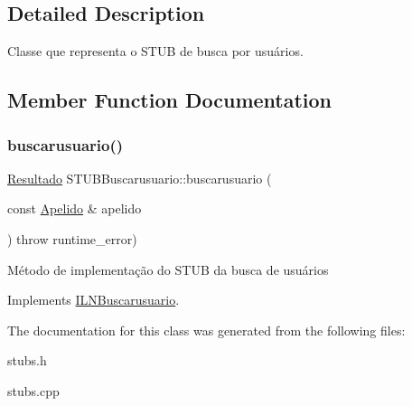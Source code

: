 \subsection{Detailed Description}
Classe que representa o S\+T\+UB de busca por usuários. 

\subsection{Member Function Documentation}
\mbox{\label{classSTUBBuscarusuario_a141fd191173b121439e480f32318aa14}} 
\subsubsection{\texorpdfstring{buscarusuario()}{buscarusuario()}}
{\footnotesize\ttfamily \hyperlink{classResultado}{Resultado} S\+T\+U\+B\+Buscarusuario\+::buscarusuario (\begin{DoxyParamCaption}\item[{const \hyperlink{classApelido}{Apelido} \&}]{apelido }\end{DoxyParamCaption}) throw  runtime\+\_\+error) \hspace{0.3cm}{\ttfamily [virtual]}}

Método de implementação do S\+T\+UB da busca de usuários 

Implements \hyperlink{classILNBuscarusuario}{I\+L\+N\+Buscarusuario}.



The documentation for this class was generated from the following files\+:\begin{DoxyCompactItemize}
\item 
stubs.\+h\item 
stubs.\+cpp\end{DoxyCompactItemize}
